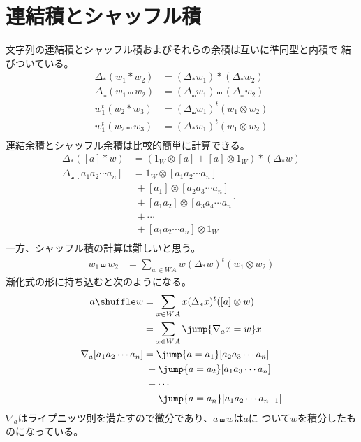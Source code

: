 \begingroup %
	\newcommand{\dup}{\myop{dup}}
	\newcommand{\myid}{\myop{id}}
	\newcommand{\homset}{\myop{hom}}
	\newcommand{\mapset}{\myop{map}}
\section{連結積とシャッフル積}\label{s1:連結積とシャッフル積} %
	文字列の連結積とシャッフル積およびそれらの余積は互いに準同型と内積で
	結びついている。
	\begin{equation*}\begin{split} %
		\Delta_*(w_1*w_2) &= (\Delta_*w_1) * (\Delta_*w_2) \\
		\Delta_\shuffle(w_1\shuffle w_2) 
			&= (\Delta_\shuffle w_1) \shuffle (\Delta_\shuffle w_2) \\
		w_1^t(w_2 * w_3) &= (\Delta_\shuffle w_1)^t(w_1\otimes w_2) \\
		w_1^t(w_2 \shuffle w_3) &= (\Delta_* w_1)^t(w_1\otimes w_2) \\
	\end{split}\end{equation*} %
	連結余積とシャッフル余積は比較的簡単に計算できる。
	\begin{equation*}\begin{split} %
		\Delta_*([a]*w) &= (1_W\otimes[a]+[a]\otimes1_W)*(\Delta_*w) \\
		\Delta_\shuffle[a_1a_2\cdots a_n] &= 1_W\otimes[a_1a_2\cdots a_n] \\
		&\; + [a_1]\otimes[a_2a_3\cdots a_n] \\
		&\; + [a_1a_2]\otimes[a_3a_4\cdots a_n] \\
		&\; + \cdots \\
		&\; + [a_1a_2\cdots a_n]\otimes1_W \\
	\end{split}\end{equation*} %
	一方、シャッフル積の計算は難しいと思う。
	\begin{equation*}\begin{split} %
		w_1\shuffle w_2 &= \sum_{w\in WA}w(\Delta_*w)^t(w_1\otimes w_2)
	\end{split}\end{equation*} %
	漸化式の形に持ち込むと次のようになる。
	\begin{equation*}\begin{split} %
		a\shuffle w &= \sum_{x\in WA}x(\Delta_*x)^t([a]\otimes w) \\
		&= \sum_{x\in WA}\jump{\nabla_{a}x=w}x \\
		\nabla_{a}[a_1a_2\cdots a_n]
		&= \jump{a=a_1}[a_2a_3\cdots a_n] \\
		&\;+ \jump{a=a_2}[a_1a_3\cdots a_n] \\
		&\;+ \cdots \\
		&\;+ \jump{a=a_n}[a_1a_2\cdots a_{n-1}] \\
	\end{split}\end{equation*} %
	$\nabla_a$はライプニッツ則を満たすので微分であり、$a\shuffle w$は$a$に
	ついて$w$を積分したものになっている。

